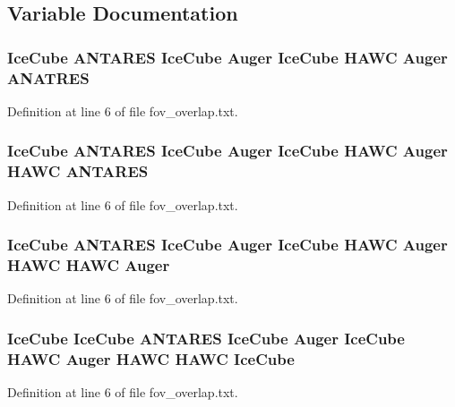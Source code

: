 \subsection{Variable Documentation}
\hypertarget{fov__overlap_8txt_aaf6038de2ed54d0799de63d0b3809ba7}{
\subsubsection[{A\-N\-A\-T\-R\-E\-S}]{ {\bf Ice\-Cube} {\bf A\-N\-T\-A\-R\-E\-S} {\bf Ice\-Cube} {\bf Auger} {\bf Ice\-Cube} H\-A\-W\-C {\bf Auger} A\-N\-A\-T\-R\-E\-S}}\label{fov__overlap_8txt_aaf6038de2ed54d0799de63d0b3809ba7}


Definition at line 6 of file fov\-\_\-overlap.\-txt.

\hypertarget{fov__overlap_8txt_a2526b3e8e5fc40d14d7a2871e61c52f5}{
\subsubsection[{A\-N\-T\-A\-R\-E\-S}]{ {\bf Ice\-Cube} A\-N\-T\-A\-R\-E\-S {\bf Ice\-Cube} {\bf Auger} {\bf Ice\-Cube} H\-A\-W\-C {\bf Auger} H\-A\-W\-C A\-N\-T\-A\-R\-E\-S}}\label{fov__overlap_8txt_a2526b3e8e5fc40d14d7a2871e61c52f5}


Definition at line 6 of file fov\-\_\-overlap.\-txt.

\hypertarget{fov__overlap_8txt_ab9538ff5d47f88ccf055854dda669e45}{
\subsubsection[{Auger}]{ {\bf Ice\-Cube} {\bf A\-N\-T\-A\-R\-E\-S} {\bf Ice\-Cube} Auger {\bf Ice\-Cube} H\-A\-W\-C Auger H\-A\-W\-C H\-A\-W\-C Auger}}\label{fov__overlap_8txt_ab9538ff5d47f88ccf055854dda669e45}


Definition at line 6 of file fov\-\_\-overlap.\-txt.

\hypertarget{fov__overlap_8txt_ae2c8b183622f423151bc24babc6afee5}{
\subsubsection[{Ice\-Cube}]{\setlength{\rightskip}{0pt plus 5cm}Ice\-Cube Ice\-Cube {\bf A\-N\-T\-A\-R\-E\-S} Ice\-Cube {\bf Auger} Ice\-Cube H\-A\-W\-C {\bf Auger} H\-A\-W\-C H\-A\-W\-C Ice\-Cube}}\label{fov__overlap_8txt_ae2c8b183622f423151bc24babc6afee5}


Definition at line 6 of file fov\-\_\-overlap.\-txt.


